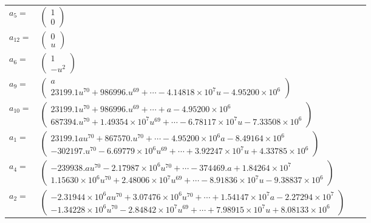 \documentclass[1p]{elsarticle_modified}
\theoremstyle{definition}
\begin{document}
\begin{tabular}{m{7pt} m{180pt} m{7pt} m{180pt} }
\flushright $a_{5}=$&$\begin{pmatrix}1\\0\end{pmatrix}$ \\
\flushright $a_{12}=$&$\begin{pmatrix}0\\u\end{pmatrix}$ \\
\flushright $a_{6}=$&$\begin{pmatrix}1\\- u^2\end{pmatrix}$ \\
\flushright $a_{9}=$&$\begin{pmatrix}a\\23199.1 u^{70}+986996. u^{69}+\cdots-4.14818\times10^{7} u-4.95200\times10^{6}\end{pmatrix}$ \\
\flushright $a_{10}=$&$\begin{pmatrix}23199.1 u^{70}+986996. u^{69}+\cdots+a-4.95200\times10^{6}\\687394. u^{70}+1.49354\times10^{7} u^{69}+\cdots-6.78117\times10^{7} u-7.33508\times10^{6}\end{pmatrix}$ \\
\flushright $a_{1}=$&$\begin{pmatrix}23199.1 a u^{70}+867570. u^{70}+\cdots-4.95200\times10^{6} a-8.49164\times10^{6}\\-302197. u^{70}-6.69779\times10^{6} u^{69}+\cdots+3.92247\times10^{7} u+4.33785\times10^{6}\end{pmatrix}$ \\
\flushright $a_{4}=$&$\begin{pmatrix}-239938. a u^{70}-2.17987\times10^{6} u^{70}+\cdots-374469. a+1.84264\times10^{7}\\1.15630\times10^{6} u^{70}+2.48006\times10^{7} u^{69}+\cdots-8.91836\times10^{7} u-9.38837\times10^{6}\end{pmatrix}$ \\
\flushright $a_{2}=$&$\begin{pmatrix}-2.31944\times10^{6} a u^{70}+3.07476\times10^{6} u^{70}+\cdots+1.54147\times10^{7} a-2.27294\times10^{7}\\-1.34228\times10^{6} u^{70}-2.84842\times10^{7} u^{69}+\cdots+7.98915\times10^{7} u+8.08133\times10^{6}\end{pmatrix}$ \\

\end{tabular}
\end{document}
